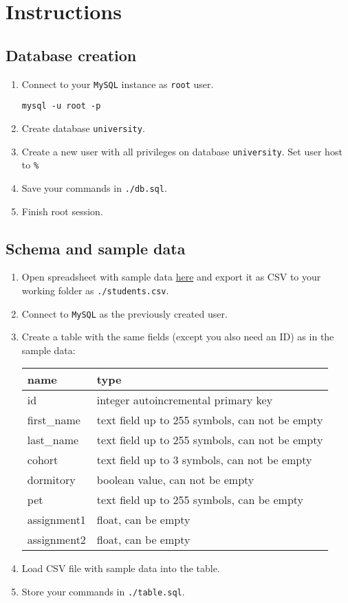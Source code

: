 \documentclass[12pt]{article}
\newcommand{\code}[1]{\texttt{#1}}
\begin{document}
\section*{Instructions}
\subsection*{Database creation}

\begin{enumerate}
\item Connect to your \code{MySQL} instance as \code{root} user.
\begin{verbatim}
mysql -u root -p
\end{verbatim}
\item Create database \code{university}.
\item Create a new user with all privileges on database \code{university}. Set user host to \code{\%}
\item Save your commands in \code{./db.sql}.
\item Finish root session.
\end{enumerate}

\subsection*{Schema and sample data}

\begin{enumerate}
\item Open spreadsheet with sample data \href{https://docs.google.com/spreadsheets/d/1fnpOlVMEQZJb3E07pDOHItz0ckAT2glQu6Vu9-_axvo/edit?usp=sharing}{here} and export it as CSV to your working folder as  \code{./students.csv}.
\item Connect to \code{MySQL} as the previously created user.
\item Create a table with the same fields (except you also need an ID) as in the sample data:

\begin{tabular}{| l | l | }
  \hline
  \textbf{name} & \textbf{type} \\
  \hline
  id & integer autoincremental primary key \\
  first\_name & text field up to 255 symbols, can not be empty \\
  last\_name & text field up to 255 symbols, can not be empty \\
  cohort & text field up to 3 symbols, can not be empty \\
  dormitory & boolean value, can not be empty \\
  pet  & text field up to 255 symbols, can be empty \\
  assignment1  & float, can be empty \\
  assignment2  & float, can be empty \\
  \hline
\end{tabular}

\item Load CSV file with sample data into the table.
\item Store your commands in \code{./table.sql}.

\end{enumerate}
\end{document}
